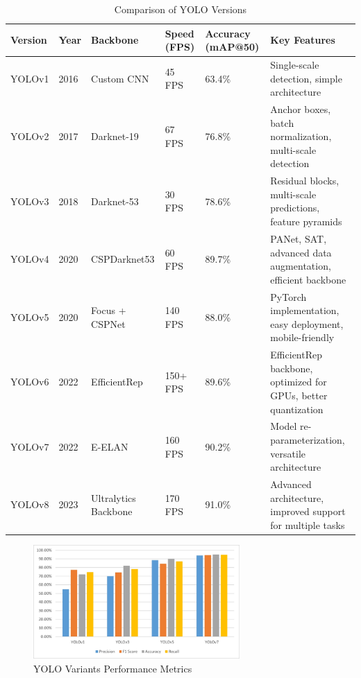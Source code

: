 %
\begin{table}[ht]
\centering
\caption{Comparison of YOLO Versions}
\vspace{5pt} 
\begin{tabular}{|p{1.8cm}|p{1.2cm}|p{2.5cm}|p{1.8cm}|p{1.8cm}|p{5.5cm}|} 
\hline
\textbf{Version} & \textbf{Year} & \textbf{Backbone} & \textbf{Speed (FPS)} & \textbf{Accuracy \small{(mAP@50)}} & \textbf{Key Features} \\ \hline
YOLOv1  & 2016 & Custom CNN       & 45 FPS   & 63.4\%  & Single-scale detection, simple architecture \\ \hline
YOLOv2  & 2017 & Darknet-19       & 67 FPS   & 76.8\%  & Anchor boxes, batch normalization, multi-scale detection \\ \hline
YOLOv3  & 2018 & Darknet-53       & 30 FPS   & 78.6\%  & Residual blocks, multi-scale predictions, feature pyramids \\ \hline
YOLOv4  & 2020 & CSPDarknet53     & 60 FPS   & 89.7\%  & PANet, SAT, advanced data augmentation, efficient backbone \\ \hline
YOLOv5  & 2020 & Focus + CSPNet   & 140 FPS  & 88.0\%  & PyTorch implementation, easy deployment, mobile-friendly \\ \hline
YOLOv6  & 2022 & EfficientRep     & 150+ FPS & 89.6\%  & EfficientRep backbone, optimized for GPUs, better quantization \\ \hline
YOLOv7  & 2022 & E-ELAN           & 160 FPS  & 90.2\%  & Model re-parameterization, versatile architecture \\ \hline
YOLOv8  & 2023 & Ultralytics Backbone & 170 FPS  & 91.0\%  & Advanced architecture, improved support for multiple tasks \\ \hline
\end{tabular}
\label{tab:yolo_versions}
\end{table}
%
%
  \begin{figure}[h!]
    \centering
    \includegraphics[width=0.7\textwidth]{images/Yolo Variants Performance Metrics.png}
    \caption{YOLO Variants Performance Metrics}
    \label{fig:enter-label}
  \end{figure}
%
%